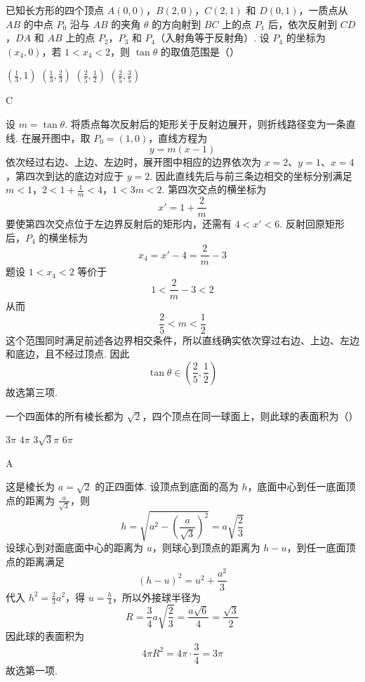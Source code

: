 \begin{problem}
已知长方形的四个顶点 \(A(0,0)\)，\(B(2,0)\)，\(C(2,1)\) 和 \(D(0,1)\)，一质点从 \(AB\) 的中点 \(P_{0}\) 沿与 \(AB\) 的夹角 \(\theta\) 的方向射到 \(BC\) 上的点 \(P_{1}\) 后，依次反射到 \(CD\)，\(DA\) 和 \(AB\) 上的点 \(P_{2}\)，\(P_{3}\) 和 \(P_{4}\)（入射角等于反射角）. 设 \(P_{4}\) 的坐标为 \((x_{4},0)\)，若 \(1 < x_{4} < 2\)，则 \(\tan \theta\) 的取值范围是（\quad）

\choices
    {\(\left(\frac{1}{3}, 1\right)\)}
    {\(\left(\frac{1}{3}, \frac{2}{3}\right)\)}
    {\(\left(\frac{2}{5}, \frac{1}{2}\right)\)}
    {\(\left(\frac{2}{5}, \frac{3}{5}\right)\)}
\end{problem}

\begin{answer}
C
\end{answer}

\begin{solution}
设 \(m=\tan\theta\). 将质点每次反射后的矩形关于反射边展开，则折线路径变为一条直线. 在展开图中，取 \(P_0=(1,0)\)，直线方程为
\[
y=m(x-1)
\]
依次经过右边、上边、左边时，展开图中相应的边界依次为 \(x=2\)、\(y=1\)、\(x=4\)，第四次到达的底边对应于 \(y=2\). 因此直线先后与前三条边相交的坐标分别满足
\(m<1\)，\(2<1+\frac1m<4\)，\(1<3m<2\).
第四次交点的横坐标为
\[
x'=1+\frac2m
\]
要使第四次交点位于左边界反射后的矩形内，还需有 \(4<x'<6\). 反射回原矩形后，\(P_4\) 的横坐标为
\[
x_4=x'-4=\frac2m-3
\]
题设 \(1<x_4<2\) 等价于
\[
1<\frac2m-3<2
\]
从而
\[
\frac25<m<\frac12
\]
这个范围同时满足前述各边界相交条件，所以直线确实依次穿过右边、上边、左边和底边，且不经过顶点. 因此
\[
\tan\theta\in\left(\frac25,\frac12\right)
\]
故选第三项.
\end{solution}

\begin{problem}
一个四面体的所有棱长都为 \(\sqrt{2}\)，四个顶点在同一球面上，则此球的表面积为（\quad）

\choices
    {\(3\pi\)}
    {\(4\pi\)}
    {\(3\sqrt{3}\pi\)}
    {\(6\pi\)}
\end{problem}

\begin{answer}
A
\end{answer}

\begin{solution}
这是棱长为 \(a=\sqrt2\) 的正四面体. 设顶点到底面的高为 \(h\)，底面中心到任一底面顶点的距离为 \(\frac{a}{\sqrt3}\)，则
\[
h=\sqrt{a^2-\left(\frac{a}{\sqrt3}\right)^2}=a\sqrt{\frac23}
\]
设球心到对面底面中心的距离为 \(u\)，则球心到顶点的距离为 \(h-u\)，到任一底面顶点的距离满足
\[
(h-u)^2=u^2+\frac{a^2}{3}
\]
代入 \(h^2=\frac23a^2\)，得 \(u=\frac h4\)，所以外接球半径为
\[
R=\frac34a\sqrt{\frac23}=\frac{a\sqrt6}{4}=\frac{\sqrt3}{2}
\]
因此球的表面积为
\[
4\pi R^2=4\pi\cdot\frac34=3\pi
\]
故选第一项.
\end{solution}


